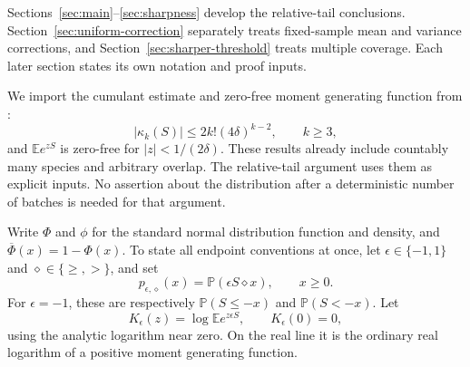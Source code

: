 \documentclass[11pt]{article}
\numberwithin{equation}{section}
\theoremstyle{remark}
\newcommand{\E}{\mathbb E}
\newcommand{\Pp}{\mathbb P}
\newcommand{\Phibar}{\overline\Phi}
\begin{document}
Sections~\ref{sec:main}--\ref{sec:sharpness} develop the relative-tail
conclusions. Section~\ref{sec:uniform-correction} separately treats
fixed-sample mean and variance corrections, and
Section~\ref{sec:sharper-threshold} treats multiple coverage. Each later
section states its own notation and proof inputs.

We import the cumulant estimate and zero-free moment generating function
from \cite[Theorem~1.2 and Proposition~3.2]{LongOptimal}:
\begin{equation}\label{eq:importedcumulants}
 |\kappa_k(S)|\le2k!(4\delta)^{k-2},\qquad k\ge3,
\end{equation}
and $\E e^{zS}$ is zero-free for $|z|<1/(2\delta)$. These results already
include countably many species and arbitrary overlap. The relative-tail argument uses
them as explicit inputs. No assertion about the distribution after a
deterministic number of batches is needed for that argument.

Write $\Phi$ and $\phi$ for the standard normal distribution function and
density, and $\Phibar(x)=1-\Phi(x)$. To state all endpoint conventions at
once, let $\epsilon\in\{-1,1\}$ and
$\diamond\in\{\ge,>\}$, and set
\[
 p_{\epsilon,\diamond}(x)=\Pp(\epsilon S\diamond x),\qquad x\ge0.
\]
For $\epsilon=-1$, these are respectively $\Pp(S\le-x)$ and
$\Pp(S<-x)$. Let
\begin{equation}\label{eq:Ksign}
 K_\epsilon(z)=\log\E e^{z\epsilon S},\qquad K_\epsilon(0)=0,
\end{equation}
using the analytic logarithm near zero. On the real line it is the ordinary
real logarithm of a positive moment generating function.
\end{document}
